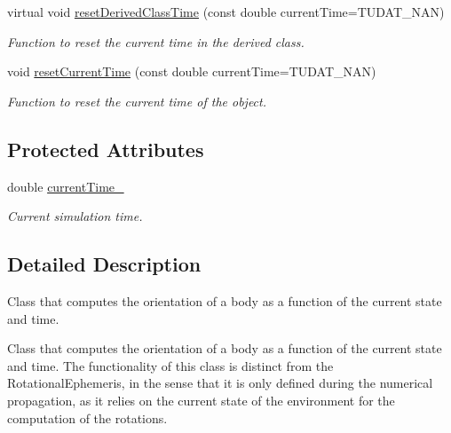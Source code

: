 \begin{DoxyCompactItemize}
virtual void \hyperlink{classtudat_1_1reference__frames_1_1DependentOrientationCalculator_adc03930adf46bdc8cb9702d0f62055c1}{reset\+Derived\+Class\+Time} (const double current\+Time=T\+U\+D\+A\+T\+\_\+\+N\+AN)
\begin{DoxyCompactList}\small\item\em Function to reset the current time in the derived class. \end{DoxyCompactList}\item 
void \hyperlink{classtudat_1_1reference__frames_1_1DependentOrientationCalculator_ab6633244ee25cfb6b24335ea899ec145}{reset\+Current\+Time} (const double current\+Time=T\+U\+D\+A\+T\+\_\+\+N\+AN)
\begin{DoxyCompactList}\small\item\em Function to reset the current time of the object. \end{DoxyCompactList}\end{DoxyCompactItemize}
\subsection*{Protected Attributes}
\begin{DoxyCompactItemize}
\item 
double \hyperlink{classtudat_1_1reference__frames_1_1DependentOrientationCalculator_a0db024b775687211d42a35f004522d98}{current\+Time\+\_\+}\hypertarget{classtudat_1_1reference__frames_1_1DependentOrientationCalculator_a0db024b775687211d42a35f004522d98}{}\label{classtudat_1_1reference__frames_1_1DependentOrientationCalculator_a0db024b775687211d42a35f004522d98}

\begin{DoxyCompactList}\small\item\em Current simulation time. \end{DoxyCompactList}\end{DoxyCompactItemize}


\subsection{Detailed Description}
Class that computes the orientation of a body as a function of the current state and time. 

Class that computes the orientation of a body as a function of the current state and time. The functionality of this class is distinct from the Rotational\+Ephemeris, in the sense that it is only defined during the numerical propagation, as it relies on the current state of the environment for the computation of the rotations. 

